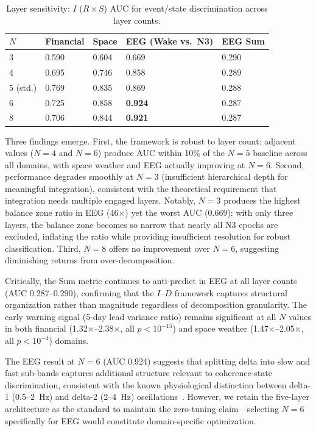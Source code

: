 \documentclass[aip,cha,reprint,amsmath,amssymb]{revtex4-2}
\begin{document}
\begin{table}[h]
\caption{\label{tab:layers_sensitivity}Layer sensitivity: $I$ ($R \times S$) AUC for event/state discrimination across layer counts.}
\centering
\begin{tabular}{lllll}
$N$ & Financial & Space & EEG (Wake vs.\ N3) & EEG Sum \\
\hline
3 & 0.590 & 0.604 & 0.669 & 0.290 \\
4 & 0.695 & 0.746 & 0.858 & 0.289 \\
5 (std.) & 0.769 & 0.835 & 0.869 & 0.288 \\
6 & 0.725 & 0.858 & \textbf{0.924} & 0.287 \\
8 & 0.706 & 0.844 & \textbf{0.921} & 0.287 \\
\end{tabular}
\end{table}

Three findings emerge. First, the framework is robust to layer count: adjacent values ($N = 4$ and $N = 6$) produce AUC within 10\% of the $N = 5$ baseline across all domains, with space weather and EEG actually improving at $N = 6$. Second, performance degrades smoothly at $N = 3$ (insufficient hierarchical depth for meaningful integration), consistent with the theoretical requirement that integration needs multiple engaged layers. Notably, $N = 3$ produces the highest balance zone ratio in EEG (46$\times$) yet the worst AUC (0.669): with only three layers, the balance zone becomes so narrow that nearly all N3 epochs are excluded, inflating the ratio while providing insufficient resolution for robust classification. Third, $N = 8$ offers no improvement over $N = 6$, suggesting diminishing returns from over-decomposition.

Critically, the Sum metric continues to anti-predict in EEG at all layer counts (AUC 0.287--0.290), confirming that the $I$--$D$ framework captures structural organization rather than magnitude regardless of decomposition granularity. The early warning signal (5-day lead variance ratio) remains significant at all $N$ values in both financial (1.32$\times$--2.38$\times$, all $p < 10^{-15}$) and space weather (1.47$\times$--2.05$\times$, all $p < 10^{-4}$) domains.

The EEG result at $N = 6$ (AUC 0.924) suggests that splitting delta into slow and fast sub-bands captures additional structure relevant to coherence-state discrimination, consistent with the known physiological distinction between delta-1 (0.5--2~Hz) and delta-2 (2--4~Hz) oscillations~\cite{amzica1998}. However, we retain the five-layer architecture as the standard to maintain the zero-tuning claim---selecting $N = 6$ specifically for EEG would constitute domain-specific optimization.
\end{document}
